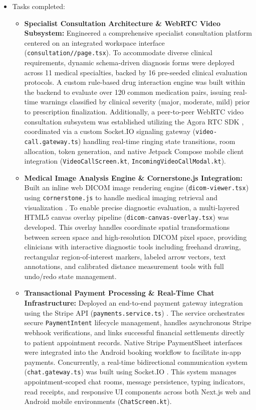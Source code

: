 \documentclass[onecolumn,journal]{IEEEtran}
\begin{document}
	\newpage
	\begin{itemize}
		\item Tasks completed:
		\begin{itemize}
			\item \textbf{Specialist Consultation Architecture \& WebRTC Video Subsystem:} Engineered a comprehensive specialist consultation platform centered on an integrated workspace interface (\texttt{consultation/\-[referralId]/\-page.tsx}). To accommodate diverse clinical requirements, dynamic schema-driven diagnosis forms were deployed across 11 medical specialties, backed by 16 pre-seeded clinical evaluation protocols. A custom rule-based drug interaction engine was built within the backend to evaluate over 120 common medication pairs, issuing real-time warnings classified by clinical severity (major, moderate, mild) prior to prescription finalization. Additionally, a peer-to-peer WebRTC video consultation subsystem was established utilizing the Agora RTC SDK \cite{agorawebrtc}, coordinated via a custom Socket.IO signaling gateway (\texttt{video-call.gateway.ts}) handling real-time ringing state transitions, room allocation, token generation, and native Jetpack Compose mobile client integration (\texttt{VideoCallScreen.kt}, \texttt{IncomingVideoCallModal.kt}).
			
			\item \textbf{Medical Image Analysis Engine \& Cornerstone.js Integration:} Built an inline web DICOM image rendering engine (\texttt{dicom-viewer.tsx}) using \texttt{cornerstone.js} to handle medical imaging retrieval and visualization \cite{dicom2021, pacs2001}. To enable precise diagnostic evaluation, a multi-layered HTML5 canvas overlay pipeline (\texttt{dicom-canvas-overlay.tsx}) was developed. This overlay handles coordinate spatial transformations between screen space and high-resolution DICOM pixel space, providing clinicians with interactive diagnostic tools including freehand drawing, rectangular region-of-interest markers, labeled arrow vectors, text annotations, and calibrated distance measurement tools with full undo/redo state management.
			
			\item \textbf{Transactional Payment Processing \& Real-Time Chat Infrastructure:} Deployed an end-to-end payment gateway integration using the Stripe API (\texttt{payments.service.ts}) \cite{stripe2024api}. The service orchestrates secure \texttt{PaymentIntent} lifecycle management, handles asynchronous Stripe webhook verifications, and links successful financial settlements directly to patient appointment records. Native Stripe PaymentSheet interfaces were integrated into the Android booking workflow to facilitate in-app payments. Concurrently, a real-time bidirectional communication system (\texttt{chat.gateway.ts}) was built using Socket.IO \cite{fette2011websocket}. This system manages appointment-scoped chat rooms, message persistence, typing indicators, read receipts, and responsive UI components across both Next.js web and Android mobile environments (\texttt{ChatScreen.kt}).
			

\end{itemize}
\end{itemize}
\end{document}
